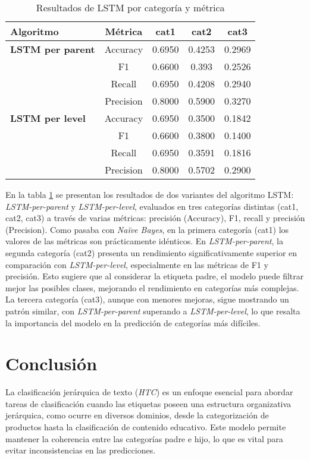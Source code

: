 \documentclass[12pt,letterpaper]{article}
\begin{document}
\begin{table}[htp]
    \centering
    \begin{tabular}{lcccc}
        \toprule
        \textbf{Algoritmo} & \textbf{Métrica}   & \textbf{cat1} & \textbf{cat2} & \textbf{cat3} \\
        \midrule
        \textbf{LSTM per parent}  & Accuracy  & 0.6950  & 0.4253  & 0.2969  \\
                                   & F1        & 0.6600  & 0.393  & 0.2526  \\
                                   & Recall    & 0.6950  & 0.4208  & 0.2940  \\
                                   & Precision & 0.8000  & 0.5900  & 0.3270  \\
        \midrule
        \textbf{LSTM per level}   & Accuracy  & 0.6950  & 0.3500  & 0.1842  \\
                                   & F1        & 0.6600  & 0.3800  & 0.1400  \\
                                   & Recall    & 0.6950  & 0.3591  & 0.1816  \\
                                   & Precision & 0.8000  & 0.5702  & 0.2900  \\
        \bottomrule
    \end{tabular}
    \caption{Resultados de LSTM por categoría y métrica}
    \label{tab:lstm-results}
\end{table}
En la tabla \ref{tab:lstm-results} se presentan los resultados de dos variantes del algoritmo LSTM: \textit{LSTM-per-parent} y \textit{LSTM-per-level}, evaluados en tres categorías distintas (cat1, cat2, cat3) a través de varias métricas: precisión (Accuracy), F1, recall y precisión (Precision). Como pasaba con \textit{Naïve Bayes}, en la primera categoría (cat1) los valores de las métricas son prácticamente idénticos. En \textit{LSTM-per-parent}, la segunda categoría (cat2) presenta un rendimiento significativamente superior en comparación con \textit{LSTM-per-level}, especialmente en las métricas de F1 y precisión. Esto sugiere que al considerar la etiqueta padre, el modelo puede filtrar mejor las posibles clases, mejorando el rendimiento en categorías más complejas. La tercera categoría (cat3), aunque con menores mejoras, sigue mostrando un patrón similar, con \textit{LSTM-per-parent} superando a \textit{LSTM-per-level}, lo que resalta la importancia del modelo en la predicción de categorías más difíciles.

\section{Conclusión}
La clasificación jerárquica de texto (\textit{HTC}) es un enfoque esencial para abordar tareas de clasificación cuando las etiquetas poseen una estructura organizativa jerárquica, como ocurre en diversos dominios, desde la categorización de productos hasta la clasificación de contenido educativo. Este modelo permite mantener la coherencia entre las categorías padre e hijo, lo que es vital para evitar inconsistencias en las predicciones.
\end{document}
